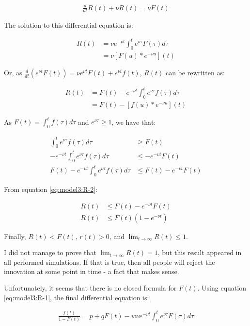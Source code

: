 \begin{align}
	\frac{d}{dt}R(t) + \nu R(t) = \nu F(t)
\end{align}

The solution to this differential equation is:

\begin{align}
	R(t) &= \nu e^{-\nu t} \int_0^t e^{\nu \tau} F(\tau) d\tau \label{eq:model3:R-1} \\
	     &= \nu \left[ F(u) * e^{-\nu u} \right](t)
\end{align}

Or, as $\frac{d}{dt} \left( e^{\nu t} F(t) \right) = \nu e^{\nu t} F(t) + e^{\nu t} f(t)$, $R(t)$ can be rewritten as:

\begin{align}
	R(t) &= F(t) - e^{-\nu t} \int_0^t e^{\nu \tau} f(\tau) d\tau \label{eq:model3:R-2} \\
	     &= F(t) - \left[ f(u) * e^{-\nu u} \right](t)
\end{align}

As $F(t) = \int_0^t f(\tau) d\tau$ and $e^{\nu \tau} \geq 1$, we have that:

\begin{align}
	\int_0^t e^{\nu \tau} f(\tau) d\tau &\geq F(t) \\
	-e^{-\nu t} \int_0^t e^{\nu \tau} f(\tau) d\tau &\leq -e^{-\nu t} F(t) \\
	F(t)-e^{-\nu t} \int_0^t e^{\nu \tau} f(\tau) d\tau &\leq F(t) - e^{-\nu t} F(t)
\end{align}

From equation \ref{eq:model3:R-2}:

\begin{align}
	R(t) &\leq F(t) - e^{-\nu t} F(t) \\
	R(t) &\leq F(t)(1 - e^{-\nu t})
\end{align}

Finally, $R(t) < F(t)$, $r(t) > 0$, and $\lim_{t \rightarrow \infty} R(t) \leq 1$.

I did not manage to prove that $\lim_{t \rightarrow \infty} R(t) = 1$, but this result appeared in all performed simulations. If that is true, then all people will reject the innovation at some point in time - a fact that makes sense.

Unfortunately, it seems that there is no closed formula for $F(t)$. Using equation \ref{eq:model3:R-1}, the final differential equation is:

\begin{align}
\frac{f(t)}{1-F(t)} = p + qF(t) - w\nu e^{-\nu t} \int_0^t e^{\nu \tau} F(\tau) d\tau
\end{align}

